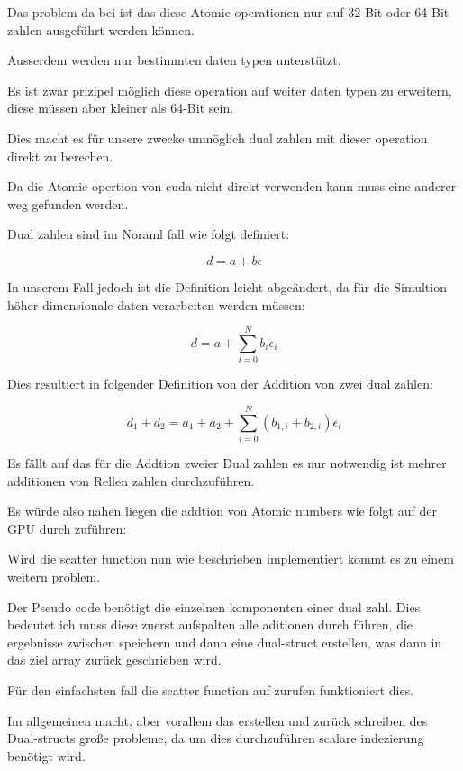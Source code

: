 
Das problem da bei ist das diese Atomic operationen nur auf 32-Bit oder 64-Bit zahlen ausgeführt werden können.

Ausserdem werden nur bestimmten daten typen unterstützt.

Es ist zwar prizipel möglich diese operation auf weiter daten typen zu erweitern, diese müssen aber kleiner als 64-Bit sein. 

Dies macht es für unsere zwecke unmöglich dual zahlen mit dieser operation direkt zu berechen.

Da die Atomic opertion von cuda nicht direkt verwenden kann muss eine anderer weg gefunden werden.

Dual zahlen sind im Noraml fall wie folgt definiert:

$$
d = a + b \epsilon
$$

In unserem Fall jedoch ist die Definition leicht abgeändert, da für die Simultion höher dimensionale daten verarbeiten werden müssen:

$$
d = a + \sum_{i = 0}^N b_i \epsilon_i 
$$

Dies resultiert in folgender Definition von der Addition von zwei dual zahlen:

$$
d_1 + d_2 = a_1 + a_2 + \sum_{i = 0}^N (b_{1, i} + b_{2, i}) \epsilon_i
$$

Es fällt auf das für die Addtion zweier Dual zahlen es nur notwendig ist mehrer additionen von Rellen zahlen
durchzuführen.

Es würde also nahen liegen die addtion von Atomic numbers wie folgt auf der GPU durch zuführen:



Wird die scatter function nun wie beschrieben implementiert kommt es zu einem weitern problem.

Der Pseudo code benötigt die einzelnen komponenten einer dual zahl. 
Dies bedeutet ich muss diese zuerst aufspalten alle aditionen durch führen, die ergebnisse zwischen speichern
und dann eine dual-struct erstellen, was dann in das ziel array zurück geschrieben wird.

Für den einfachsten fall die scatter function auf zurufen funktioniert dies.

Im allgemeinen macht, aber vorallem das erstellen und zurück schreiben des Dual-structs große probleme,
da um dies durchzuführen scalare indezierung benötigt wird.

